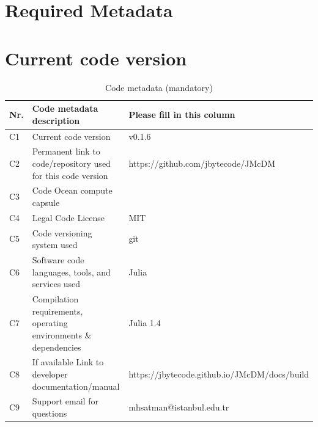 \documentclass[preprint,review, 12pt, a4paper]{elsarticle}
\begin{document}
\section*{Required Metadata}
\label{required_metadata}

\section*{Current code version}
\label{section:current_code_version}


\begin{table}[H]
\begin{tabular}{|l|p{6.5cm}|p{6.5cm}|}
\hline
\textbf{Nr.} & \textbf{Code metadata description} & \textbf{Please fill in this column} \\
\hline
C1 & Current code version & v0.1.6\\
\hline
C2 & Permanent link to code/repository used for this code version & https://github.com/jbytecode/JMcDM \\
\hline
C3 & Code Ocean compute capsule & %
\\
\hline
C4 & Legal Code License   & MIT\\
\hline
C5 & Code versioning system used & git \\
\hline
C6 & Software code languages, tools, and services used & Julia \\
\hline
C7 & Compilation requirements, operating environments \& dependencies & Julia 1.4 \\
\hline
C8 & If available Link to developer documentation/manual & https://jbytecode.github.io/JMcDM/docs/build \\
\hline
C9 & Support email for questions & mhsatman@istanbul.edu.tr\\
\hline
\end{tabular}
\caption{Code metadata (mandatory)}
\label{code_metadata_mandatory} 
\end{table}


\linenumbers

\end{document}
